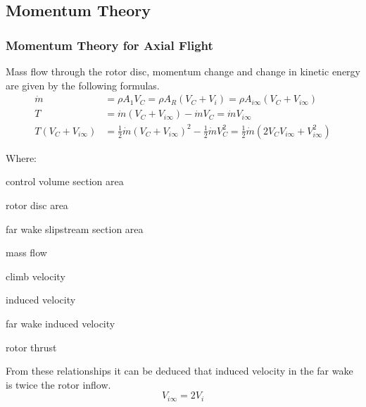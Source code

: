 \subsection{Momentum Theory}

\subsubsection{Momentum Theory for Axial Flight}

Mass flow through the rotor disc, momentum change and change in kinetic energy are given by the following formulas. \cite{Padfield2007}
\begin{align}
  \label{eq-aero-mass-flow}
  \dot m
  &=
  \rho A_1 V_C = \rho A_R \left( V_C + V_i \right)
  =
  \rho A_{i \infty} \left( V_C + V_{i \infty}  \right) \\
  \label{eq-aero-thrust-1}
  T
  &=
  \dot m \left( V_C + V_{i \infty} \right)
  -
  \dot m V_C = \dot m V_{ i \infty } \\
  T \left( V_C + V_{ i \infty } \right)
  &=
  \frac{1}{2} \dot m \left( V_C + V_{ i \infty } \right)^2
  -
  \frac{1}{2} \dot m V_C^2
  =
  \frac{1}{2} \dot m \left( 2V_C V_{ i \infty } + V_{ i \infty }^2 \right)
\end{align}

Where:
\begin{description}[align=right,labelwidth=3cm]
  \item [$A_1 = \pi R_1^2$] [m\textsuperscript{2}] control volume section area
  \item [$A_R = \pi R^2$] [m\textsuperscript{2}] rotor disc area
  \item [$A_{\infty} = \pi R_{\infty}^2$] [m\textsuperscript{2}] far wake slipstream section area
  \item [$\dot m$] [kg/s] mass flow
  \item [$V_C$] [m/s] climb velocity
  \item [$V_i$] [m/s] induced velocity
  \item [$V_{i \infty}$] [m/s] far wake induced velocity
  \item [$T$] [N] rotor thrust
\end{description}

From these relationships it can be deduced that induced velocity in the far wake is twice the rotor inflow. \cite{Padfield2007}
\begin{equation}
  \label{eq-aero-indeced-vel}
  V_{i \infty} = 2 V_i
\end{equation}

